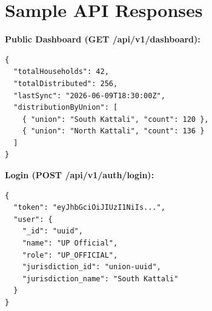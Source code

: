 \section{Sample API Responses}
\textbf{Public Dashboard (GET /api/v1/dashboard):}
\begin{verbatim}
{
  "totalHouseholds": 42,
  "totalDistributed": 256,
  "lastSync": "2026-06-09T18:30:00Z",
  "distributionByUnion": [
    { "union": "South Kattali", "count": 120 },
    { "union": "North Kattali", "count": 136 }
  ]
}
\end{verbatim}

\textbf{Login (POST /api/v1/auth/login):}
\begin{verbatim}
{
  "token": "eyJhbGciOiJIUzI1NiIs...",
  "user": {
    "_id": "uuid",
    "name": "UP Official",
    "role": "UP_OFFICIAL",
    "jurisdiction_id": "union-uuid",
    "jurisdiction_name": "South Kattali"
  }
}
\end{verbatim}
